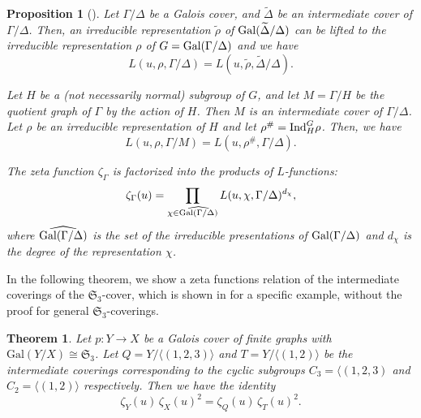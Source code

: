 \documentclass[lualatex,12pt]{article}
\newtheorem{thm}{Theorem}
\newtheorem{prop}{Proposition}
\begin{document}
\begin{prop}[\cite{terras2010zeta}]
 \label{prop:factorization}
 Let $\Gamma/\Delta$ be a Galois cover,
 and $\widetilde{\Delta}$ be
 an intermediate cover of $\Gamma/\Delta$.
 Then, an irreducible representation  $\widetilde{\rho}$ of ${\rm Gal}(\widetilde{\Delta}/\Delta)$
 can be lifted to the irreducible representation ${\rho}$
 of $G={\rm Gal}(\Gamma/\Delta)$ and we have
 \begin{equation}
  \label{eq:Lfun1}
  L(u,\rho,\Gamma/\Delta) =  L(u, \widetilde{\rho}, \widetilde{\Delta}/\Delta).
 \end{equation}

 Let $H$ be a (not necessarily normal) subgroup of $G$,
 and let $M = \Gamma/H$ be the quotient graph of $\Gamma$
 by the action of $H$.
 Then $M$ is an intermediate cover of $\Gamma/\Delta$.
 Let $\rho$ be an irreducible representation of $H$ and
 let $\rho^\# = {\rm Ind}_H^G\rho$. Then, we have
 \begin{equation}
  \label{eq:Linducedrep}
  L(u, \rho, \Gamma/M) = L(u, \rho^\#, \Gamma/\Delta).  
 \end{equation}

 The zeta function $\zeta_\Gamma$ is factorized into the products of
 $L$-functions:
 \begin{equation}
  \label{eq:zetafactorization}
  \zeta_\Gamma(u)
 =
 \prod_{\chi\in \widehat{{\rm Gal}(\Gamma/\Delta)}}
 L(u, \chi, \Gamma/\Delta)^{d_\chi},
 \end{equation}
where $\widehat{{\rm Gal}(\Gamma/\Delta)}$ is the
set of the irreducible presentations of ${\rm Gal}(\Gamma/\Delta)$
and $d_\chi$ is the degree of the representation $\chi$.
\end{prop}


In the following theorem,
we show a zeta functions relation of the intermediate coverings 
of the ${\mathfrak S}_3$-cover,
which is shown in \cite{stark2000zeta,terras2010zeta}
for a specific example, 
without the proof for general ${\mathfrak S}_3$-coverings.
\begin{thm}
\label{thm:zeta-relation-S3}
Let $p:Y\to X$ be a Galois cover of finite graphs with
$\mathrm{Gal}(Y/X)\cong {\mathfrak S}_3$.  Let
$Q=Y/\langle(1,2,3)\rangle$ and $T=Y/\langle(1,2)\rangle$ be the
intermediate coverings corresponding to the cyclic subgroups 
$C_3=\langle(1,2,3)$ and $C_2=\langle(1,2)\rangle$ respectively.  
Then we have the identity
\[
\zeta_Y(u)\,\zeta_X(u)^2 = \zeta_Q(u)\,\zeta_T(u)^2.
\]
\end{thm}
\end{document}
